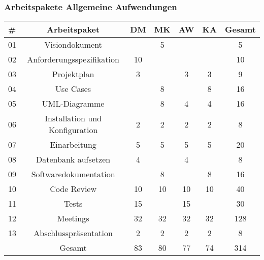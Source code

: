 \documentclass[12pt,a4paper,onecolumn]{article}
\begin{document}
\subsubsection{Arbeitspakete Allgemeine Aufwendungen}
\begin{tabular}{|l|c|c|c|c|c|c|}
\hline
      \textbf{\#} & \textbf{Arbeitspaket} & \textbf{DM} & \textbf{MK} & \textbf{AW} & \textbf{KA} & \textbf{Gesamt} \\

\hline
01 & Visiondokument & & 5 & & & 5\\
\hline
02 & Anforderungsspezifikation & 10 & & & & 10\\
\hline
03 & Projektplan & 3 & & 3 & 3 & 9\\
\hline
04 & Use Cases & & 8 & & 8 & 16 \\
\hline
05 & UML-Diagramme & & 8 & 4 & 4 & 16 \\
\hline
06 & Installation und Konfiguration & 2 & 2 & 2 & 2 & 8\\
\hline
07 & Einarbeitung & 5 & 5 & 5 & 5 & 20\\
\hline
08 & Datenbank aufsetzen & 4 & & 4 & & 8\\
\hline
09 & Softwaredokumentation & & 8 & & 8 & 16\\
\hline
10 & Code Review & 10 & 10 & 10 & 10 & 40\\
\hline
11 & Tests & 15 & & 15 & & 30\\
\hline
12 & Meetings & 32 & 32 & 32 & 32& 128\\
\hline
13 & Abschlusspräsentation & 2 & 2 & 2 & 2 & 8\\
\hline
\hline
 & Gesamt & 83 & 80 & 77 & 74 & 314\\
\hline
\end{tabular}
\end{document}

